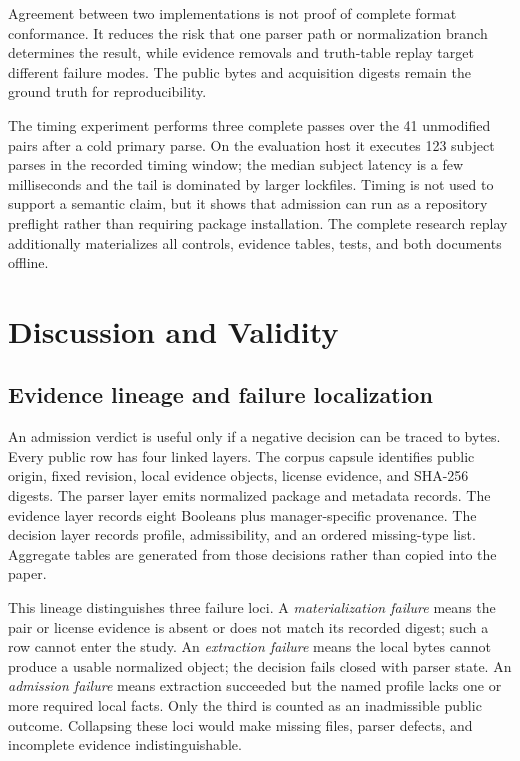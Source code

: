 \documentclass[10pt,conference]{IEEEtran}
\begin{document}
Agreement between two implementations is not proof of complete format conformance. It reduces the risk that one parser path or normalization branch determines the result, while evidence removals and truth-table replay target different failure modes. The public bytes and acquisition digests remain the ground truth for reproducibility.

The timing experiment performs three complete passes over the 41 unmodified pairs after a cold primary parse. On the evaluation host it executes 123 subject parses in the recorded timing window; the median subject latency is a few milliseconds and the tail is dominated by larger lockfiles. Timing is not used to support a semantic claim, but it shows that admission can run as a repository preflight rather than requiring package installation. The complete research replay additionally materializes all controls, evidence tables, tests, and both documents offline.

\section{Discussion and Validity}
\subsection{Evidence lineage and failure localization}
An admission verdict is useful only if a negative decision can be traced to bytes. Every public row has four linked layers. The corpus capsule identifies public origin, fixed revision, local evidence objects, license evidence, and SHA-256 digests. The parser layer emits normalized package and metadata records. The evidence layer records eight Booleans plus manager-specific provenance. The decision layer records profile, admissibility, and an ordered missing-type list. Aggregate tables are generated from those decisions rather than copied into the paper.

This lineage distinguishes three failure loci. A \emph{materialization failure} means the pair or license evidence is absent or does not match its recorded digest; such a row cannot enter the study. An \emph{extraction failure} means the local bytes cannot produce a usable normalized object; the decision fails closed with parser state. An \emph{admission failure} means extraction succeeded but the named profile lacks one or more required local facts. Only the third is counted as an inadmissible public outcome. Collapsing these loci would make missing files, parser defects, and incomplete evidence indistinguishable.
\end{document}
